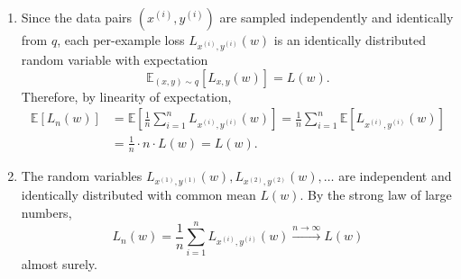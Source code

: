 \documentclass[11pt]{article}
\newcommand{\E}{\mathbb{E}}
\begin{document}
\begin{solution}
\begin{enumerate}
    \item
        Since the data pairs $(x^{(i)}, y^{(i)})$ are sampled independently and
        identically from $q$, each per-example loss $L_{x^{(i)},y^{(i)}}(w)$ is
        an identically distributed random variable with expectation
        \begin{equation*}
            \E_{(x,y)\sim q}[L_{x,y}(w)] = L(w).
        \end{equation*}
        Therefore, by linearity of expectation,
        \begin{align*}
            \E[L_n(w)]
            &= \E\left[\frac{1}{n}\sum_{i=1}^n L_{x^{(i)},y^{(i)}}(w)\right]
            = \frac{1}{n}\sum_{i=1}^n \E[L_{x^{(i)},y^{(i)}}(w)] \\
            &= \frac{1}{n} \cdot n \cdot L(w)
            = L(w).
        \end{align*}

    \item
        The random variables $L_{x^{(1)},y^{(1)}}(w), L_{x^{(2)},y^{(2)}}(w),
        \ldots$ are independent and identically distributed with common mean
        $L(w)$. By the strong law of large numbers,
        \begin{equation*}
            L_n(w)
            = \frac{1}{n}\sum_{i=1}^n L_{x^{(i)},y^{(i)}}(w)
            \xrightarrow{n\to\infty} L(w)
        \end{equation*}
        almost surely. \qedhere
\end{enumerate}
\end{solution}
\end{document}
